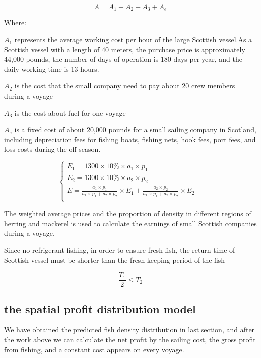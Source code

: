 \documentclass{mcmthesis}
\begin{document}
\begin{equation}\label{8}
A=A_1+A_2+A_3+A_e
\end{equation}

Where:

$A_1$ represents the average working cost per hour of the large Scottish vessel.As a Scottish vessel with a length of 40 meters, the purchase price is approximately 44,000 pounds, the number of days of operation is 180 days per year, and the daily working time is 13 hours.

$A_2$ is the cost that the small company need to pay about 20 crew members during a voyage

$A_3$ is the cost about fuel for one voyage

$A_e$ is a fixed cost of about 20,000 pounds for a small sailing company in Scotland, including depreciation fees for fishing boats, fishing nets, hook fees, port fees, and loss costs during the off-season.
 


\begin{equation}
\left\{
\begin{array}{lr}

E_1=1300 \times 10\% \times a_1 \times p_1 &\\
E_2=1300 \times 10\% \times a_2 \times p_2 &\\
E= \frac{a_1 \times p_1}{a_1 \times p_1+ a_2 \times p_2} \times E_1 + \frac{a_2 \times p_2}{a_1 \times p_1+ a_2 \times p_2} \times E_2\\

\end{array}
\right.
\end{equation}

The weighted average prices and the proportion of density in different regions of herring and mackerel  is used to calculate the earnings of small Scottish companies during a voyage. 

Since no refrigerant fishing, in order to ensure fresh fish, the return time of Scottish vessel  must be shorter than the fresh-keeping period of the fish

\begin{equation}\label{10}
\frac{T_1}{2}\leq T_2
\end{equation}



\subsection{the spatial profit distribution model}
  We have obtained the predicted fish density distribution in last section, and after the work above we can calculate the net profit by the sailing cost, the gross profit from fishing, and a constant cost appears on every voyage.
  
\end{document}
